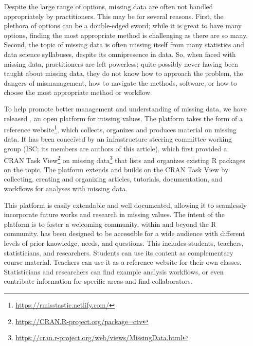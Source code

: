 Despite the large range of options, 
missing data are often not handled appropriately by practitioners. This may be for several reasons. First, the plethora of options can be a double-edged sword; while it is great to have many options, finding the most appropriate method is challenging as there are so many. Second, the topic of missing data is often missing itself from many 
statistics and data science syllabuses, despite its omnipresence in 
data. So, when faced with missing data, practitioners are left powerless; quite 
possibly never having been taught about missing data, they do not know how to approach the problem, the dangers of  mismanagement, how to navigate the methods, software, or how to choose 
the most appropriate method or workflow.


To help promote better management and understanding of missing data, we have released , an open platform for missing values. 
The platform takes the form of a reference website\footnote{\url{https://rmisstastic.netlify.com/}}, which collects, organizes and produces
material on missing data. %
It has been conceived by an infrastructure steering committee
 working group (ISC; its members are authors of this article), which first provided a CRAN Task View\footnote{\url{https://CRAN.R-project.org/package=ctv}} on missing data\footnote{\url{https://cran.r-project.org/web/views/MissingData.html}} that
lists and organizes existing {R} packages on the topic.
The  platform extends and builds on the CRAN Task View by collecting, creating and organizing articles, tutorials,
documentation, and  workflows for analyses with missing data. 

This platform is easily extendable and well documented, allowing it to seamlessly incorporate future works and research in missing values. 
The intent of the platform is to foster a welcoming community, within and beyond the {R} community.
 has been designed to be accessible for a wide audience with different levels of prior knowledge, needs, and
questions. This includes students, teachers, statisticians, and researchers. Students can use its content as complementary course material. Teachers can use it as a reference website for their own classes. Statisticians and researchers can find example analysis workflows, or even contribute information for specific areas and find collaborators.

